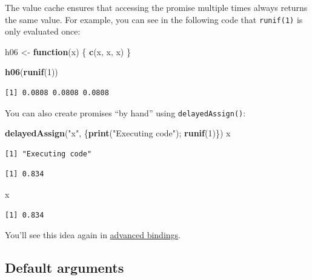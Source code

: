 \documentclass[]{book}
\newenvironment{Shaded}{\begin{snugshade}}{\end{snugshade}}
\newcommand{\ControlFlowTok}[1]{\textcolor[rgb]{0.13,0.29,0.53}{\textbf{#1}}}
\newcommand{\DecValTok}[1]{\textcolor[rgb]{0.00,0.00,0.81}{#1}}
\newcommand{\KeywordTok}[1]{\textcolor[rgb]{0.13,0.29,0.53}{\textbf{#1}}}
\newcommand{\NormalTok}[1]{#1}
\newcommand{\StringTok}[1]{\textcolor[rgb]{0.31,0.60,0.02}{#1}}
\theoremstyle{definition}
\theoremstyle{definition}
\theoremstyle{definition}
\theoremstyle{remark}
\begin{document}
The value cache ensures that accessing the promise multiple times always
returns the same value. For example, you can see in the following code
that \texttt{runif(1)} is only evaluated once:

\begin{Shaded}
\begin{Highlighting}[]
\NormalTok{h06 <-}\StringTok{ }\ControlFlowTok{function}\NormalTok{(x) \{ }
  \KeywordTok{c}\NormalTok{(x, x, x)  }
\NormalTok{\}}

\KeywordTok{h06}\NormalTok{(}\KeywordTok{runif}\NormalTok{(}\DecValTok{1}\NormalTok{))}
\end{Highlighting}
\end{Shaded}

\begin{verbatim}
[1] 0.0808 0.0808 0.0808
\end{verbatim}

You can also create promises ``by hand'' using \texttt{delayedAssign()}:

\begin{Shaded}
\begin{Highlighting}[]
\KeywordTok{delayedAssign}\NormalTok{(}\StringTok{"x"}\NormalTok{, \{}\KeywordTok{print}\NormalTok{(}\StringTok{"Executing code"}\NormalTok{); }\KeywordTok{runif}\NormalTok{(}\DecValTok{1}\NormalTok{)\})}
\NormalTok{x}
\end{Highlighting}
\end{Shaded}

\begin{verbatim}
[1] "Executing code"
\end{verbatim}

\begin{verbatim}
[1] 0.834
\end{verbatim}

\begin{Shaded}
\begin{Highlighting}[]
\NormalTok{x}
\end{Highlighting}
\end{Shaded}

\begin{verbatim}
[1] 0.834
\end{verbatim}

You'll see this idea again in
\protect\hyperlink{advanced-bindings}{advanced bindings}.

\hypertarget{default-arguments}{%
\subsection{Default arguments}\label{default-arguments}}
\end{document}
